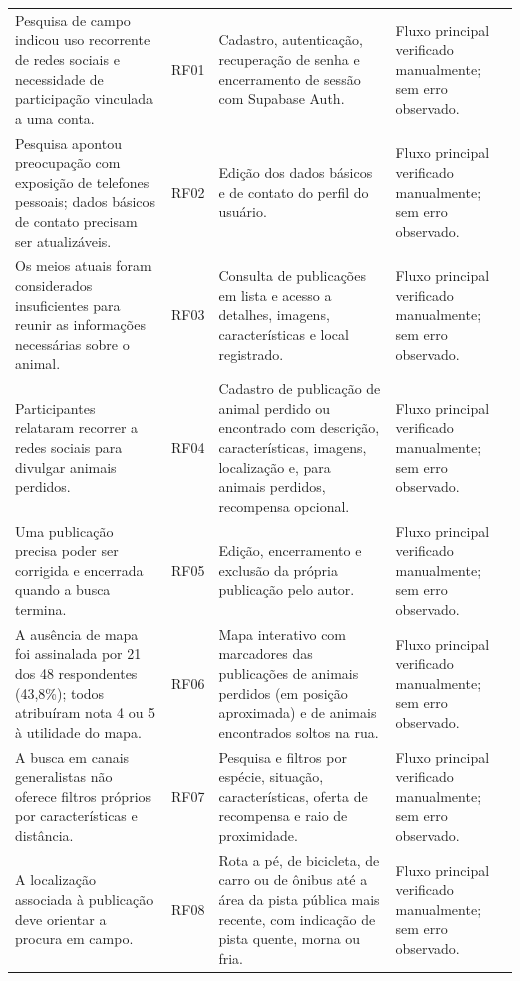 {\begin{longtable}{|>{\raggedright\arraybackslash}p{4.1cm}|>{\centering\arraybackslash}p{1.8cm}|>{\raggedright\arraybackslash}p{5.4cm}|>{\raggedright\arraybackslash}p{2.7cm}|}
\hline
\multicolumn{4}{|c|}{Fonte: Autoria própria (2026)} \\ \hline
\endlastfoot
Pesquisa de campo indicou uso recorrente de redes sociais e necessidade de participação vinculada a uma conta. & RF01 & Cadastro, autenticação, recuperação de senha e encerramento de sessão com Supabase Auth. & Fluxo principal verificado manualmente; sem erro observado. \\ \hline
Pesquisa apontou preocupação com exposição de telefones pessoais; dados básicos de contato precisam ser atualizáveis. & RF02 & Edição dos dados básicos e de contato do perfil do usuário. & Fluxo principal verificado manualmente; sem erro observado. \\ \hline
Os meios atuais foram considerados insuficientes para reunir as informações necessárias sobre o animal. & RF03 & Consulta de publicações em lista e acesso a detalhes, imagens, características e local registrado. & Fluxo principal verificado manualmente; sem erro observado. \\ \hline
Participantes relataram recorrer a redes sociais para divulgar animais perdidos. & RF04 & Cadastro de publicação de animal perdido ou encontrado com descrição, características, imagens, localização e, para animais perdidos, recompensa opcional. & Fluxo principal verificado manualmente; sem erro observado. \\ \hline
Uma publicação precisa poder ser corrigida e encerrada quando a busca termina. & RF05 & Edição, encerramento e exclusão da própria publicação pelo autor. & Fluxo principal verificado manualmente; sem erro observado. \\ \hline
A ausência de mapa foi assinalada por 21 dos 48 respondentes (43,8\%); todos atribuíram nota 4 ou 5 à utilidade do mapa. & RF06 & Mapa interativo com marcadores das publicações de animais perdidos (em posição aproximada) e de animais encontrados soltos na rua. & Fluxo principal verificado manualmente; sem erro observado. \\ \hline
A busca em canais generalistas não oferece filtros próprios por características e distância. & RF07 & Pesquisa e filtros por espécie, situação, características, oferta de recompensa e raio de proximidade. & Fluxo principal verificado manualmente; sem erro observado. \\ \hline
A localização associada à publicação deve orientar a procura em campo. & RF08 & Rota a pé, de bicicleta, de carro ou de ônibus até a área da pista pública mais recente, com indicação de pista quente, morna ou fria. & Fluxo principal verificado manualmente; sem erro observado. \\ \hline

\end{longtable}}

